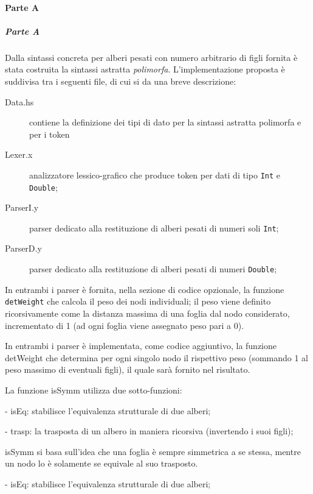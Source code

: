 \documentclass[a4paper, oneside, 11pt]{article}
\begin{document}
\paragraph*{Parte A}
\subparagraph*{Parte A}
\newpage
Dalla sintassi concreta per alberi pesati con numero arbitrario di figli fornita \`e stata costruita la sintassi astratta \textit{polimorfa}.
L'implementazione proposta \`e suddivisa tra i seguenti file, di cui si da una breve descrizione:
\begin{description}
	\item[Data.hs] contiene la definizione dei tipi di dato per la sintassi astratta polimorfa  e per i token
	\item[Lexer.x] analizzatore lessico-grafico che produce token per dati di tipo \texttt{Int} e \texttt{Double};
	\item[ParserI.y] parser dedicato alla restituzione di alberi pesati di numeri soli \texttt{Int};
	\item[ParserD.y] parser dedicato alla restituzione di alberi pesati di numeri \texttt{Double};
\end{description}	
\par
In entrambi i parser \`e fornita, nella sezione di codice opzionale, la funzione \texttt{detWeight} che calcola il peso dei nodi individuali; il peso viene definito ricorsivamente come la distanza massima di una foglia dal nodo considerato, incrementato di 1 (ad ogni foglia viene assegnato peso pari a 0). 





\newpage
In entrambi i parser \`e implementata, come codice aggiuntivo, la funzione detWeight che determina per ogni singolo nodo il rispettivo peso (sommando 1 al peso massimo di eventuali figli), il quale sarà fornito nel risultato.

   La funzione isSymm utilizza due sotto-funzioni:

- isEq: stabilisce l'equivalenza strutturale di due alberi;

- trasp: la trasposta di un albero in maniera ricorsiva (invertendo i suoi figli);

isSymm si basa sull'idea che una foglia \`e sempre simmetrica a se stessa, mentre un nodo lo \`e solamente se equivale al suo trasposto.


- isEq: stabilisce l'equivalenza strutturale di due alberi;
\end{document}
